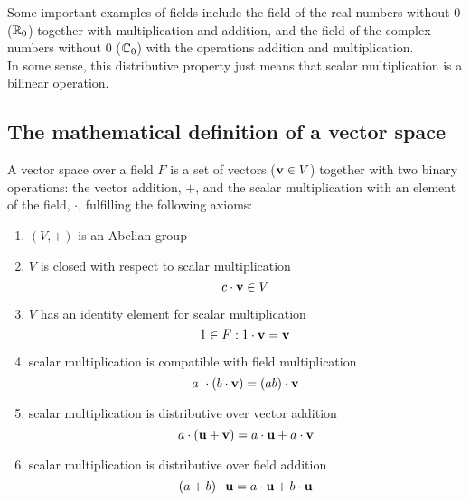         Some important examples of fields include the field of the real numbers without $0$ ($\mathbb{R}_0$) together with multiplication and addition, and the field of the complex numbers without $0$ ($\mathbb{C}_0$) with the operations addition and multiplication. \\

        In some sense, this distributive property just means that scalar multiplication is a bilinear operation. \\

    \subsection{The mathematical definition of a vector space}
        A vector space over a field $F$ is a set of vectors ($\vb{v} \in V$) together with two binary operations: the vector addition, $+$, and the scalar multiplication with an element of the field, $\cdot$, fulfilling the following axioms:
            \begin{enumerate}
                \item $(V,+)$ is an Abelian group

                \item $V$ is closed with respect to scalar multiplication
                \begin{equation}
                    c \cdot \vb{v} \in V
                \end{equation}

                \item $V$ has an identity element for scalar multiplication
                \begin{equation}
                    1 \in F: 1 \cdot \vb{v} = \vb{v}
                \end{equation}

                \item scalar multiplication is compatible with field multiplication
                \begin{equation}
                    a \cdot (b \cdot \vb{v}) = (ab) \cdot \vb{v}
                \end{equation}

                \item scalar multiplication is distributive over vector addition
                \begin{equation}
                    a \cdot (\vb{u} + \vb{v}) = a \cdot \vb{u} + a \cdot \vb{v}
                \end{equation}

                \item scalar multiplication is distributive over field addition
                \begin{equation}
                    (a + b) \cdot \vb{u} = a \cdot \vb{u} + b \cdot \vb{u}
                \end{equation}
            \end{enumerate}

